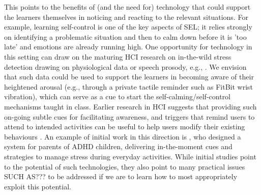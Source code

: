 \documentclass[prodmode,acmtochi]{acmsmall}
\newcommand{\todolater}[1]{}
\newcommand{\rephrase}[1]{\textrm{\textrm{\textcolor{gray}{#1}}}}
\begin{document}
This points to the benefits of (and the need for) technology that could support the learners themselves in noticing and reacting to the relevant situations. For example, learning self-control is one of the key aspects of SEL; it relies strongly on identifying a problematic situation and then to calm down before it is 'too late' and emotions are already running high. One opportunity for technology in this setting can draw on the maturing HCI research on in-the-wild stress detection drawing on physiological data or speech prosody, e.g., \cite{Hernandez2011,Poh2010,Pina2014,Zeng2009,Ertin2011}. We envision that such data could be used to support the learners in becoming aware of their heightened arousal (e.g., through a private tactile reminder such as FitBit wrist vibration), which can serve as a cue to start the self-calming/self-control mechanisms taught in class. Earlier research in HCI suggests that providing such on-going subtle cues for facilitating awareness, and triggers that remind users to attend to intended activities can be useful to help users modify their existing behaviours \cite{Consolvo2009,Obermair2008}. An example of initial work in this direction is , who designed a system for parents of ADHD children, delivering in-the-moment cues and strategies to manage stress during everyday activities.  While initial studies point to the potential of such technologies, they also point to many practical issues SUCH AS??? to be addressed if we are to learn how to most appropriately exploit this potential. 
\todolater{???Other similar opportunities for technology could be in supporting other learned topics such as prompting awareness of own emotions, }



\end{document}
